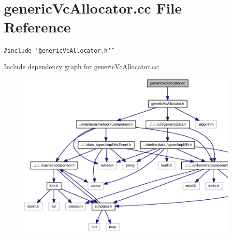 \section{genericVcAllocator.cc File Reference}
\label{genericVcAllocator_8cc}
{\tt \#include \char`\"{}genericVcAllocator.h\char`\"{}}\par


Include dependency graph for genericVcAllocator.cc:\nopagebreak
\begin{figure}[H]
\begin{center}
\leavevmode
\includegraphics[width=339pt]{genericVcAllocator_8cc__incl}
\end{center}
\end{figure}
